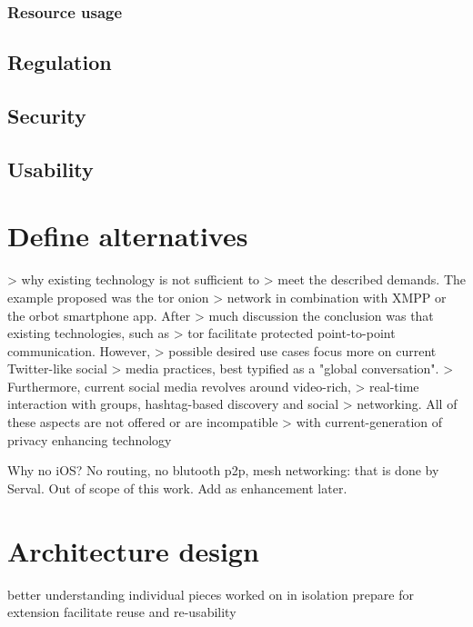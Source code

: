 \subsubsection{Resource usage}

\subsection{Regulation}

\subsection{Security}

\subsection{Usability}





\section{Define alternatives} %
> why existing technology is not sufficient to
> meet the described demands. The example proposed was the tor onion
> network in combination with XMPP or the orbot smartphone app. After
> much discussion the conclusion was that existing technologies, such as
> tor facilitate protected point-to-point communication. However,
> possible desired use cases focus more on current Twitter-like social
> media practices, best typified as a "global conversation".
> Furthermore, current social media revolves around video-rich,
> real-time interaction with groups, hashtag-based discovery and social
> networking. All of these aspects are not offered or are incompatible
> with current-generation of privacy enhancing technology



Why no iOS?
No routing, no blutooth p2p, mesh networking: that is done by Serval. Out of scope of this work. Add as enhancement later.


\section{Architecture design}

better understanding
individual pieces worked on in isolation
prepare for extension
facilitate reuse and re-usability

